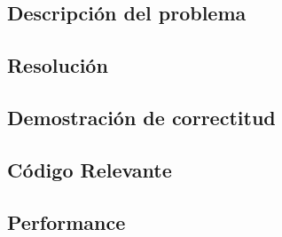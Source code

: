 \subsection{Descripci\'on del problema}

\newpage

\subsection{Resoluci\'on}

\newpage

\subsection{Demostraci\'on de correctitud}

\newpage

%

\subsection{C\'odigo Relevante}

\newpage

\subsection{Performance}

\newpage